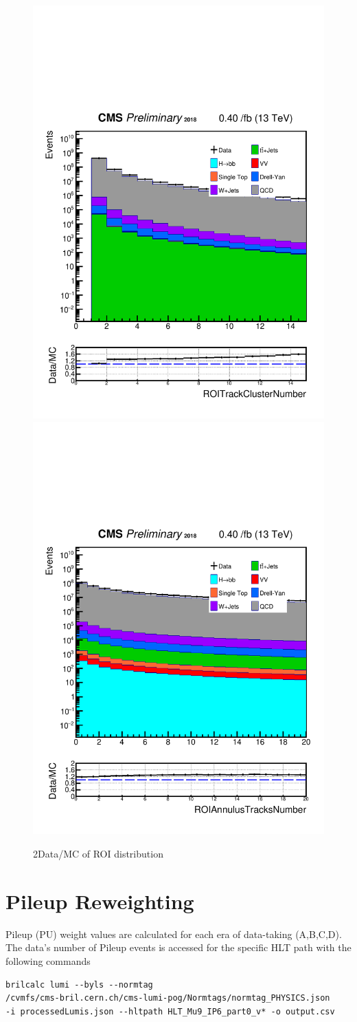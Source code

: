 \begin{figure}[h!]
  \caption{2Data/MC of ROI distribution}
  \label{fig:2ROIs}
  \centering
  \includegraphics[width=0.47\linewidth]{figs/Data_AnalysisNoteplot_MS-15_ctauS-10_ROITrackClusterNumber.pdf}
  \includegraphics[width=0.47\linewidth]{figs/Data_AnalysisNoteplot_MS-15_ctauS-10_ROIAnnulusTracksNumber.pdf}
\end{figure}
\section{Pileup Reweighting}

Pileup (PU) weight values are calculated for each era of data-taking (A,B,C,D).
The data's number of Pileup events is accessed for the specific HLT path with the following commands

\begin{verbatim}
brilcalc lumi --byls --normtag 
/cvmfs/cms-bril.cern.ch/cms-lumi-pog/Normtags/normtag_PHYSICS.json 
-i processedLumis.json --hltpath HLT_Mu9_IP6_part0_v* -o output.csv
\end{verbatim}

